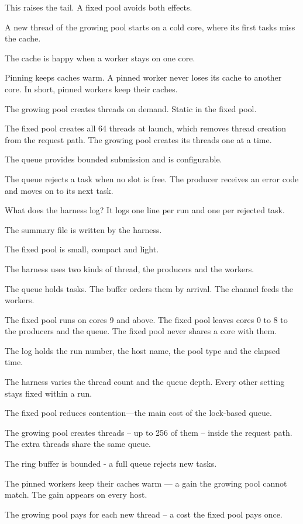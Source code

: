 This raises the tail. A fixed pool avoids both effects.

A new thread of the growing pool starts on a cold core, where its first tasks miss the cache.

The cache is happy when a worker stays on one core.

Pinning keeps caches warm. A pinned worker never loses its cache to another core. In short, pinned workers keep their caches.

The growing pool creates threads on demand. Static in the fixed pool.

The fixed pool creates all 64 threads at launch, which removes thread creation from the request path. The growing pool creates its threads one at a time.

The queue provides bounded submission and is configurable.

The queue rejects a task when no slot is free. The producer receives an error code and moves on to its next task.

What does the harness log? It logs one line per run and one per rejected task.

The summary file is written by the harness.

The fixed pool is small, compact and light.

The harness uses two kinds of thread, the producers and the workers.

The queue holds tasks. The buffer orders them by arrival. The channel feeds the workers.

The fixed pool runs on cores 9 and above. The fixed pool leaves cores 0 to 8 to the producers and the queue. The fixed pool never shares a core with them.

The log holds the run number, the host name, the pool type and the elapsed time.

The harness varies the thread count and the queue depth. Every other setting stays fixed within a run.

The fixed pool reduces contention---the main cost of the lock-based queue.

The growing pool creates threads -- up to 256 of them -- inside the request path. The extra threads share the same queue.

The ring buffer is bounded - a full queue rejects new tasks.

The pinned workers keep their caches warm — a gain the growing pool cannot match. The gain appears on every host.

The growing pool pays for each new thread – a cost the fixed pool pays once.

